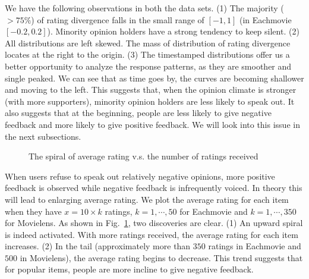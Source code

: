\documentclass{sig-alternate}
\begin{document}
We have the following observations in both the data sets. (1) The majority ($>75\%$) of rating divergence falls in the small range of $[-1,1]$ (in Eachmovie $[-0.2,0.2]$). Minority opinion holders have a strong tendency to keep silent. (2) All distributions are left skewed. The mass of distribution of rating divergence locates at the right to the origin. (3) The timestamped distributions offer us a better opportunity to analyze the response patterns, as they are smoother and single peaked. We can see that as time goes by, the curves are becoming shallower and moving to the left. This suggests that, when the opinion climate is stronger (with more supporters), minority opinion holders are less likely to speak out. It also suggests that at the beginning, people are less likely to give negative feedback and more likely to give positive feedback. We will look into this issue in the next subsections.

\begin{figure}[htbp]
\centering
\centering
{}
\caption{The spiral of average rating v.s. the number of ratings received}\label{fig:spiral}
\end{figure}

When users refuse to speak out relatively negative opinions, more positive feedback is observed while negative feedback is infrequently voiced. In theory this will lead to enlarging average rating. We plot the average rating for each item when they have $x=10\times k$ ratings, $k=1,\cdots,50$ for Eachmovie and $k=1,\cdots,350$ for Movielens. As shown in Fig.~\ref{fig:spiral}, two discoveries are clear. (1) An upward spiral is indeed activated. With more ratings received, the average rating for each item  increases. (2) In the tail (approximately more than $350$ ratings in Eachmovie and $500$ in Movielens), the average rating begins to decrease. This trend suggests that for popular items,  people are more incline to give negative feedback.
\end{document}
